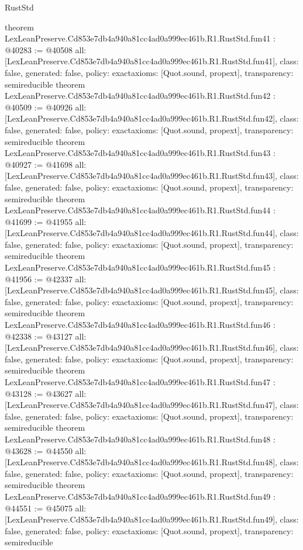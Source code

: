 \begin{lexlean}{RustStd}
\begin{coremodule}
{}
theorem LexLeanPreserve.Cd853e7db4a940a81cc4ad0a999ec461b.R1.RustStd.fun41 : @40283 := @40508 {
  all: [LexLeanPreserve.Cd853e7db4a940a81cc4ad0a999ec461b.R1.RustStd.fun41],
  class: false,
  generated: false,
  policy: exact{axioms: [Quot.sound, propext]},
  transparency: semireducible
}
theorem LexLeanPreserve.Cd853e7db4a940a81cc4ad0a999ec461b.R1.RustStd.fun42 : @40509 := @40926 {
  all: [LexLeanPreserve.Cd853e7db4a940a81cc4ad0a999ec461b.R1.RustStd.fun42],
  class: false,
  generated: false,
  policy: exact{axioms: [Quot.sound, propext]},
  transparency: semireducible
}
theorem LexLeanPreserve.Cd853e7db4a940a81cc4ad0a999ec461b.R1.RustStd.fun43 : @40927 := @41698 {
  all: [LexLeanPreserve.Cd853e7db4a940a81cc4ad0a999ec461b.R1.RustStd.fun43],
  class: false,
  generated: false,
  policy: exact{axioms: [Quot.sound, propext]},
  transparency: semireducible
}
theorem LexLeanPreserve.Cd853e7db4a940a81cc4ad0a999ec461b.R1.RustStd.fun44 : @41699 := @41955 {
  all: [LexLeanPreserve.Cd853e7db4a940a81cc4ad0a999ec461b.R1.RustStd.fun44],
  class: false,
  generated: false,
  policy: exact{axioms: [Quot.sound, propext]},
  transparency: semireducible
}
theorem LexLeanPreserve.Cd853e7db4a940a81cc4ad0a999ec461b.R1.RustStd.fun45 : @41956 := @42337 {
  all: [LexLeanPreserve.Cd853e7db4a940a81cc4ad0a999ec461b.R1.RustStd.fun45],
  class: false,
  generated: false,
  policy: exact{axioms: [Quot.sound, propext]},
  transparency: semireducible
}
theorem LexLeanPreserve.Cd853e7db4a940a81cc4ad0a999ec461b.R1.RustStd.fun46 : @42338 := @43127 {
  all: [LexLeanPreserve.Cd853e7db4a940a81cc4ad0a999ec461b.R1.RustStd.fun46],
  class: false,
  generated: false,
  policy: exact{axioms: [Quot.sound, propext]},
  transparency: semireducible
}
theorem LexLeanPreserve.Cd853e7db4a940a81cc4ad0a999ec461b.R1.RustStd.fun47 : @43128 := @43627 {
  all: [LexLeanPreserve.Cd853e7db4a940a81cc4ad0a999ec461b.R1.RustStd.fun47],
  class: false,
  generated: false,
  policy: exact{axioms: [Quot.sound, propext]},
  transparency: semireducible
}
theorem LexLeanPreserve.Cd853e7db4a940a81cc4ad0a999ec461b.R1.RustStd.fun48 : @43628 := @44550 {
  all: [LexLeanPreserve.Cd853e7db4a940a81cc4ad0a999ec461b.R1.RustStd.fun48],
  class: false,
  generated: false,
  policy: exact{axioms: [Quot.sound, propext]},
  transparency: semireducible
}
theorem LexLeanPreserve.Cd853e7db4a940a81cc4ad0a999ec461b.R1.RustStd.fun49 : @44551 := @45075 {
  all: [LexLeanPreserve.Cd853e7db4a940a81cc4ad0a999ec461b.R1.RustStd.fun49],
  class: false,
  generated: false,
  policy: exact{axioms: [Quot.sound, propext]},
  transparency: semireducible
}
\end{coremodule}
\end{lexlean}
